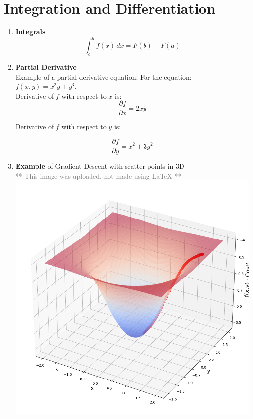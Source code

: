 \documentclass{article}
\begin{document}
\section {Integration and Differentiation}
\begin {enumerate}
    \item \textbf{Integrals}
    $$\int_a^b f(x) \, dx = F(b) - F(a)$$
    \item \textbf{Partial Derivative}
     \\Example of a partial derivative equation: For the equation:
     \\\( f(x, y) = x^2 y + y^3 \).
     \\Derivative of \( f \) with respect to \( x \) is:
    \begin{equation}\frac{\partial f}{\partial x} = 2xy\end{equation}
    
    Derivative of \( f \) with respect to \( y \) is:

    \begin{equation}\frac{\partial f}{\partial y} = x^2 + 3y^2\end{equation}
    \item \textbf{Example} of Gradient Descent with scatter points in 3D 
    \\
    \textcolor{gray}{** This image was uploaded, not made using LaTeX **}
    \\
    \includegraphics[scale=0.5]{download.png}
\end {enumerate}
\end{document}
